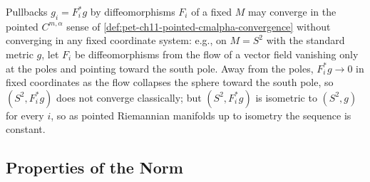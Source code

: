 \begin{remark}
  \label{rem:pet-ch11-cmalpha-convergence-pullback-warning}

  Pullbacks $g_i=F_i^*g$ by diffeomorphisms $F_i$ of a fixed $M$ may converge
  in the pointed $C^{m,\alpha}$ sense of
  \cref{def:pet-ch11-pointed-cmalpha-convergence} without converging in any
  fixed coordinate system: e.g., on $M=S^2$ with the standard metric $g$, let
  $F_i$ be diffeomorphisms from the flow of a vector field vanishing only at
  the poles and pointing toward the south pole. Away from the poles,
  $F_i^*g\to0$ in fixed coordinates as the flow collapses the sphere toward
  the south pole, so $(S^2,F_i^*g)$ does not converge classically; but
  $(S^2,F_i^*g)$ is isometric to $(S^2,g)$ for every $i$, so as pointed
  Riemannian manifolds up to isometry the sequence is constant.
\end{remark}

\subsection{Properties of the Norm}

